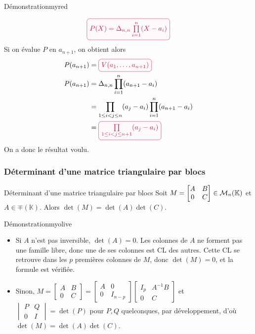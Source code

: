\begin{demo}{Démonstration}{myred}
\begin{itemize}
    \[ \lilbox{myred}{$P(X) = \Delta_{n,n} \prod\limits_{i=1}^n (X - a_i)$} \]
    Si on évalue $P$ en $a_{n+1}$, on obtient alors 
    \begin{align*}
        P(a_{n+1}) &= \lilbox{myred}{$V(a_1,\ldots,a_{n+1})$} \\
        P(a_{n+1}) &= \Delta_{n,n} \prod\limits_{i=1}^n (a_{n+1} - a_i) \\
        &= \prod\limits_{1 \leq i < j \leq n} (a_j - a_i) \prod\limits_{i=1}^n (a_{n+1} - a_i) \\
        &= \lilbox{myred}{$\prod\limits_{1 \leq i < j \leq n+1} (a_j - a_i)$}
    \end{align*}
    On a donc le résultat voulu.
    \end{itemize}
    \end{demo}

    \subsubsection{Déterminant d’une matrice triangulaire par blocs}

    \begin{prop}{Déterminant d’une matrice triangulaire par blocs}{}
        Soit $M = \begin{bmatrix}
            A & B \\
            0 & C
        \end{bmatrix} \in \mathcal{M}_{n}(\mathbb{K})$ et $A \in \mp(\mathbb{K})$. Alors $\det(M) = \det(A)\det(C)$.
    \end{prop}

    \begin{demo}{Démonstration}{myolive}
        \begin{itemize}
            \item Si $A$ n’est pas inversible, $\det(A) = 0$. Les colonnes de $A$ ne forment pas une famille libre, donc une de ses colonnes est CL des autres. Cette CL se retrouve dans les $p$ premières colonnes de $M$, donc $\det(M) = 0$, et la formule est vérifiée.
            \item Sinon, $M = \begin{bmatrix}
                A & B \\
                0 & C
            \end{bmatrix} = \begin{bmatrix}
                A & 0 \\
                0 & I_{n-p}
            \end{bmatrix} \begin{bmatrix}
                I_p & A^{-1} B \\
                0 & C 
            \end{bmatrix}$ et $\begin{vmatrix}
                P & Q \\
                0 & I
            \end{vmatrix} = \det(P)$ pour $P,Q$ quelconques, par développement, d’où $\det(M) = \det(A) \det(C)$.
        \end{itemize}
    \end{demo}

